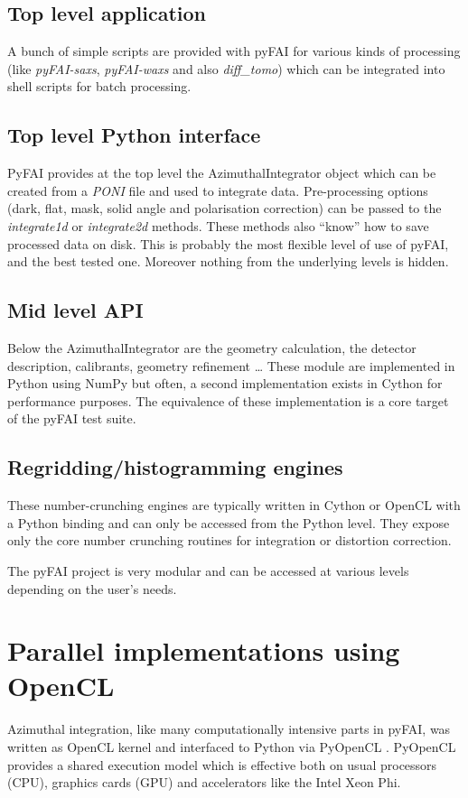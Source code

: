 \documentclass{iucr}
\begin{document}
\subsection{Top level application}
A bunch of simple scripts are provided with pyFAI for various kinds of
processing (like \textit{pyFAI-saxs},  \textit{pyFAI-waxs} and also \textit{diff\_tomo}) 
which can be integrated into shell scripts for batch
processing. 

\subsection{Top level Python interface}
PyFAI provides at the top level the AzimuthalIntegrator object which can be
created from a \textit{PONI} file and used to integrate data. 
Pre-processing options
(dark, flat, mask, solid angle and polarisation correction) can be passed to
the \textit{integrate1d} or \textit{integrate2d} methods.
These methods also ``know'' how to save processed data on disk.
This is probably the most flexible level of use of pyFAI, and the best tested
one. Moreover nothing from the underlying levels is hidden.

\subsection{Mid level API}
Below the AzimuthalIntegrator are the geometry calculation, the detector
description, calibrants, geometry refinement \ldots 
These module are
implemented in Python using NumPy but often, a second
implementation exists in Cython for performance purposes.
The equivalence of these implementation is a core target of the pyFAI test
suite.

\subsection{Regridding/histogramming engines}
These number-crunching engines are typically written in Cython or OpenCL with a
Python binding and can only be accessed from the Python level. 
They expose only the core number crunching routines for integration or
distortion correction.

The pyFAI project is very modular and can be accessed at various
levels depending on the user's needs.

\section{Parallel implementations using OpenCL}
\label{annex_opencl}
Azimuthal integration, like  many computationally intensive parts in pyFAI,
was written as OpenCL kernel and interfaced to Python via PyOpenCL
\cite{pyopencl}.
PyOpenCL provides a shared execution model which is effective both on
usual processors (CPU), graphics cards (GPU) and accelerators like the Intel
Xeon Phi.
\end{document}
